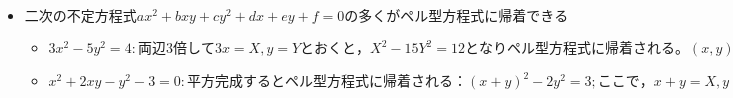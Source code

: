 \documentclass[dvipdfmx,uplatex]{jsarticle}
\begin{document}
\begin{itemize}
\begin{itemize}
		\item $二次の不定方程式 ax^2+bxy+cy^2+dx+ey+f=0 の多くがペル型方程式に帰着できる$
		\begin{itemize}
			\item $3x^2-5y^2=4: 両辺 3 倍して 3x=X,y=Y とおくと，X^2−15Y^2=12 となりペル型方程式に帰着される。(x,y) が整数なら (X,Y) も整数なので上記のペル型方程式の整数解(X,Y) が求まればもとの整数解も全て求まる。$
			\item $x^2+2xy-y^2-3=0: 平方完成するとペル型方程式に帰着される：(x+y)^2−2y^2=3;ここで，x+y=X,y=Y とおくと，X^2−2Y^2=3 となる。(x,y) が整数なら (X,Y) も整数なので上記のペル型方程式の整数解(X,Y) が求まればもとの整数解も全て求まる。$
		\end{itemize}
	\end{itemize}
\end{itemize}
\end{document}
